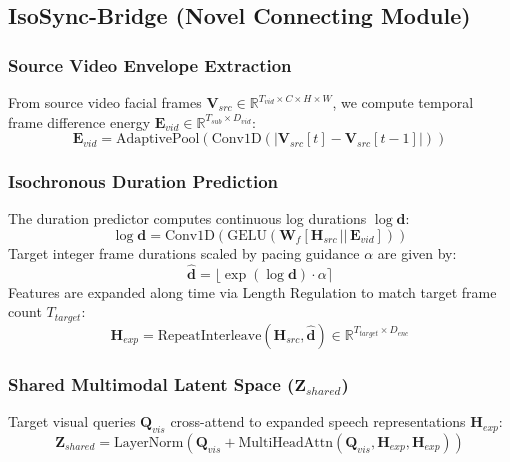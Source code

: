 \documentclass[10pt,journal,compsoc]{IEEEtran}
\begin{document}
\subsection{IsoSync-Bridge (Novel Connecting Module)}

\subsubsection{Source Video Envelope Extraction}
From source video facial frames $\mathbf{V}_{src} \in \mathbb{R}^{T_{vid} \times C \times H \times W}$, we compute temporal frame difference energy $\mathbf{E}_{vid} \in \mathbb{R}^{T_{sub} \times D_{vid}}$:
\begin{equation}
\mathbf{E}_{vid} = \text{AdaptivePool}(\text{Conv1D}(|\mathbf{V}_{src}[t] - \mathbf{V}_{src}[t-1]|))
\end{equation}

\subsubsection{Isochronous Duration Prediction}
The duration predictor computes continuous log durations $\log \mathbf{d}$:
\begin{equation}
\log \mathbf{d} = \text{Conv1D}(\text{GELU}(\mathbf{W}_f [\mathbf{H}_{src} \,||\, \mathbf{E}_{vid}]))
\end{equation}
Target integer frame durations scaled by pacing guidance $\alpha$ are given by:
\begin{equation}
\hat{\mathbf{d}} = \lfloor \exp(\log \mathbf{d}) \cdot \alpha \rceil
\end{equation}
Features are expanded along time via Length Regulation to match target frame count $T_{target}$:
\begin{equation}
\mathbf{H}_{exp} = \text{RepeatInterleave}(\mathbf{H}_{src}, \hat{\mathbf{d}}) \in \mathbb{R}^{T_{target} \times D_{enc}}
\end{equation}

\subsubsection{Shared Multimodal Latent Space ($\mathbf{Z}_{shared}$)}
Target visual queries $\mathbf{Q}_{vis}$ cross-attend to expanded speech representations $\mathbf{H}_{exp}$:
\begin{equation}
\mathbf{Z}_{shared} = \text{LayerNorm}(\mathbf{Q}_{vis} + \text{MultiHeadAttn}(\mathbf{Q}_{vis}, \mathbf{H}_{exp}, \mathbf{H}_{exp}))
\end{equation}
\end{document}
